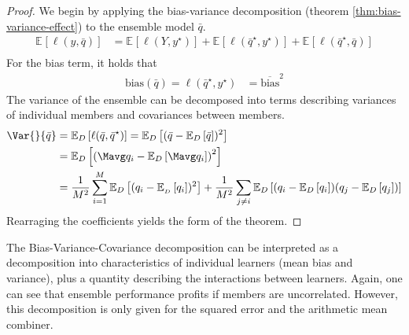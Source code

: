 \documentclass[../main.tex]{subfiles}
\begin{document}
\begin{proof} 
We begin by applying the bias-variance decomposition (theorem  \ref{thm:bias-variance-effect}) to the ensemble model $\bar{q}$.
\begin{align*}
\mathbb{E}_{}\left[ \ell(y, \bar{q})  \right]  
&= \mathbb{E}_{}\left[ \ell(Y, y^\star) \right]  + \mathbb{E}_{}\left[ \ell(\bar{q}^\star, y^\star) \right] + \mathbb{E}_{}\left[ \ell(\bar{q}^\star, \bar{q}) \right]  \\
\end{align*}
For the bias term, it holds that \cite{ueda_GeneralizationErrorEnsemble_1996}
\begin{align*}
\text{bias} (\bar{q}) = 
\ell(\bar{q}^\star, y^\star)
&=  \overline{\text{bias} }^2   
\end{align*}
The variance of the ensemble can be decomposed into terms describing variances of individual members and covariances between members.
\begin{align*}
\Var{}{\bar{q}} 
&= \mathbb{E}_{D}\left[ \ell(\bar{q}, \bar{q}^\star) \right] 
= \mathbb{E}_{D}\left[ (\bar{q} - \mathbb{E}_{D}\left[ \bar{q} \right] )^2 \right]  \\
&= \mathbb{E}_{D}\left[ \left(  \Mavg q_{i} - \mathbb{E}_{D}\left[ \Mavg q_{i} \right]  \right)^2 \right] \\
&= \frac{1}{M^2} \sum_{i=1}^M \mathbb{E}_{D}\left[ (q_{i} - \mathbb{E}_{_{D}}\left[ q_{i} \right] )^2 \right] 
+ \frac{1}{M^2} \sum_{j \not=i} \mathbb{E}_{D}\left[ (q_{i} - \mathbb{E}_{D}\left[ q_{i} \right] ) (q_{j} - \mathbb{E}_{D}\left[ q_{j} \right] ) \right] 
\end{align*}
Rearraging the coefficients yields the form of the theorem.
\end{proof}
The Bias-Variance-Covariance decomposition can be interpreted as a decomposition into characteristics of individual learners (mean bias and variance), plus a quantity describing the interactions between learners. Again, one can see that ensemble performance profits if members are uncorrelated.
However, this decomposition is only given for the squared error and the arithmetic mean combiner. 
\end{document}
